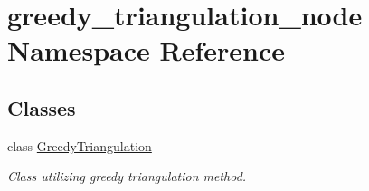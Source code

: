 \hypertarget{namespacegreedy__triangulation__node}{}\section{greedy\+\_\+triangulation\+\_\+node Namespace Reference}
\label{namespacegreedy__triangulation__node}
\subsection*{Classes}
\begin{DoxyCompactItemize}
\item 
class \hyperlink{classgreedy__triangulation__node_1_1_greedy_triangulation}{Greedy\+Triangulation}
\begin{DoxyCompactList}\small\item\em Class utilizing greedy triangulation method. \end{DoxyCompactList}\end{DoxyCompactItemize}
